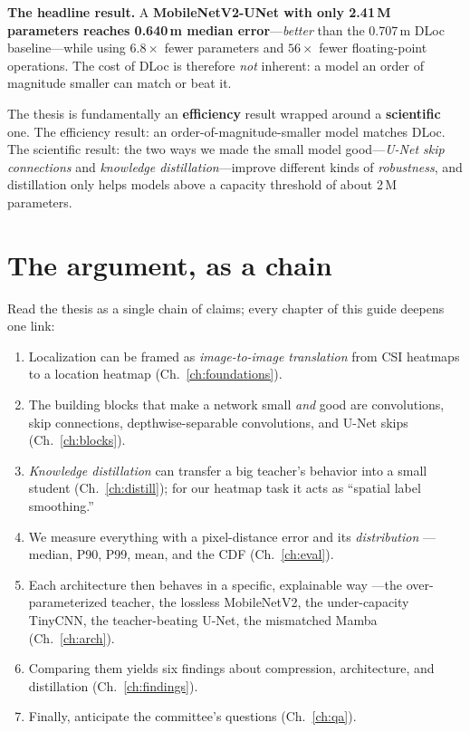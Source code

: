 \textbf{The headline result.} A \textbf{MobileNetV2-UNet with only 2.41\,M parameters reaches
0.640\,m median error}---\emph{better} than the 0.707\,m DLoc baseline---while using $6.8\times$ fewer
parameters and $56\times$ fewer floating-point operations. The cost of DLoc is therefore \emph{not}
inherent: a model an order of magnitude smaller can match or beat it.

\begin{keyidea}
The thesis is fundamentally an \textbf{efficiency} result wrapped around a \textbf{scientific} one.
The efficiency result: an order-of-magnitude-smaller model matches DLoc. The scientific result: the
two ways we made the small model good---\emph{U-Net skip connections} and \emph{knowledge
distillation}---improve different kinds of \emph{robustness}, and distillation only helps models above
a capacity threshold of about 2\,M parameters.
\end{keyidea}

\section*{The argument, as a chain}

Read the thesis as a single chain of claims; every chapter of this guide deepens one link:

\begin{enumerate}[leftmargin=2.2em]
  \item Localization can be framed as \emph{image-to-image translation} from CSI heatmaps to a
  location heatmap (Ch.~\ref{ch:foundations}).
  \item The building blocks that make a network small \emph{and} good are convolutions, skip
  connections, depthwise-separable convolutions, and U-Net skips (Ch.~\ref{ch:blocks}).
  \item \emph{Knowledge distillation} can transfer a big teacher's behavior into a small student
  (Ch.~\ref{ch:distill}); for our heatmap task it acts as ``spatial label smoothing.''
  \item We measure everything with a pixel-distance error and its \emph{distribution} ---median, P90,
  P99, mean, and the CDF (Ch.~\ref{ch:eval}).
  \item Each architecture then behaves in a specific, explainable way ---the over-parameterized
  teacher, the lossless MobileNetV2, the under-capacity TinyCNN, the teacher-beating U-Net, the
  mismatched Mamba (Ch.~\ref{ch:arch}).
  \item Comparing them yields six findings about compression, architecture, and distillation
  (Ch.~\ref{ch:findings}).
  \item Finally, anticipate the committee's questions (Ch.~\ref{ch:qa}).
\end{enumerate}

